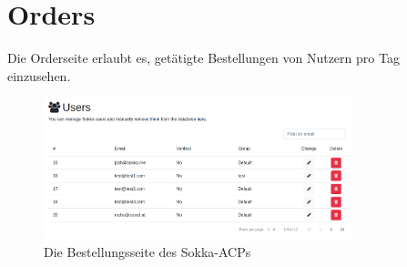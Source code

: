 \section{Orders}

Die Orderseite erlaubt es, getätigte Bestellungen von Nutzern pro Tag einzusehen.

\begin{figure}[ht]
    \centering
    \includegraphics[width=0.8\textwidth]{images/ACP/users-page.png}
    \caption{Die Bestellungsseite des Sokka-ACPs}
\end{figure}
